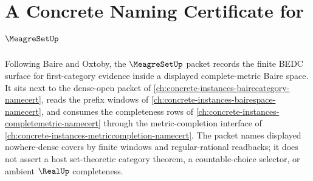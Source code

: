 \chapter{A Concrete Naming Certificate for $\MeagreSetUp$}
\label{ch:concrete-instances-meagre-set-namecert}

Following Baire and Oxtoby, the $\MeagreSetUp$ packet records the finite BEDC surface for first-category evidence inside a displayed complete-metric Baire space. It sits next to the dense-open packet of \autoref{ch:concrete-instances-bairecategory-namecert}, reads the prefix windows of \autoref{ch:concrete-instances-bairespace-namecert}, and consumes the completeness rows of \autoref{ch:concrete-instances-completemetric-namecert} through the metric-completion interface of \autoref{ch:concrete-instances-metriccompletion-namecert}. The packet names displayed nowhere-dense covers by finite windows and regular-rational readbacks; it does not assert a host set-theoretic category theorem, a countable-choice selector, or ambient $\RealUp$ completeness.

